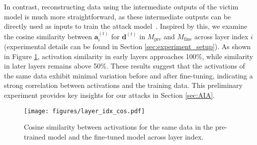 In contrast, reconstructing data using the intermediate outputs of the victim model is much more straightforward, as these intermediate outputs can be directly used as inputs to train the attack model~\cite{pasquini2021unleashing,li2023sentence}. Inspired by this, we examine the cosine similarity between $\bm a_i^{(t)}$ for $\bm d^{(t)}$ in ${M}_\text{pre}$ and ${M}_\text{fine}$ across layer index $i$ (experimental details can be found in Section \ref{sec:experiment_setup}). As shown in Figure \ref{fig:layer_idx_act_cos}, activation similarity in early layers approaches 100\%, while similarity in later layers remains above 50\%. These results suggest that the activations of the same data exhibit minimal variation before and after fine-tuning, indicating a strong correlation between activations and the training data. This preliminary experiment provides key insights for our attacks in Section \ref{sec:AIA}.


\begin{figure}[t]
  \texttt{[image: figures/layer\_idx\_cos.pdf]} 
  \caption {Cosine similarity between activations for the same data in the pre-trained model and the fine-tuned model across layer index.}
  \label{fig:layer_idx_act_cos}
  \vspace{-1em}
\end{figure}